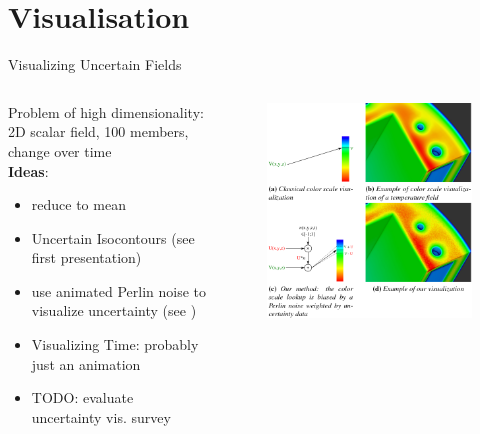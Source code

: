 \section{Visualisation}
\begin{frame}{Visualizing Uncertain Fields}
\begin{columns}
      \begin{column}{.6 \textwidth}
Problem of high dimensionality: 2D scalar field, 100 members, change over time \\ 
\textbf{Ideas}:
         \begin{itemize}
           \item reduce to mean 
           \item Uncertain Isocontours (see first presentation)
           \item use animated Perlin noise to visualize uncertainty (see \citeauthor{coninx_visualization_2011} \cite{coninx_visualization_2011})
           \item Visualizing Time: probably just an animation
           \item TODO: evaluate uncertainty vis. survey \cite{kamal_recent_2021}
         \end{itemize}
        
      \end{column}
      \begin{column}{.4 \textwidth}
    \begin{figure}[t]
      \centering
      \includegraphics[width=.8 \columnwidth]{imglib/perlin_noise.png}
    \end{figure}
        
      \end{column}
    \end{columns}

\end{frame}
